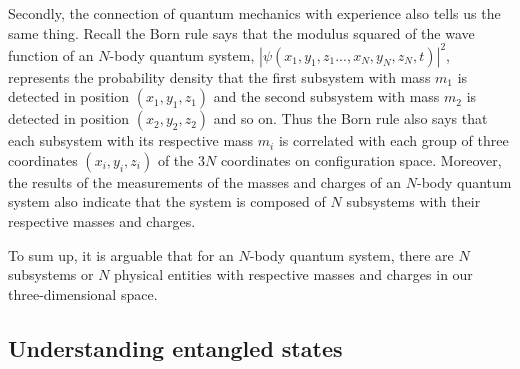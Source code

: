 Secondly, the connection of quantum mechanics with experience also tells us the same thing. Recall the Born rule says that the modulus squared of the wave function of an $N$-body quantum system, $|\psi(x_1,y_1,z_1..., x_N,y_N,z_N,t)|^2$, represents the probability density that the first subsystem with mass $m_1$ is detected in position $(x_1,y_1,z_1)$ and the second subsystem with mass $m_2$ is detected in position $(x_2,y_2,z_2)$ and so on. Thus the Born rule also says that each subsystem with its respective mass $m_i$ is  correlated with each group of three coordinates $(x_i, y_i, z_i)$ of the $3N$ coordinates on configuration space. Moreover, the results of the measurements of the masses and charges of an $N$-body quantum system also indicate that the system is composed of $N$ subsystems with their respective masses and charges.

To sum up, it is arguable that for an $N$-body quantum system, there are $N$ subsystems or $N$ physical entities with respective masses and charges in our three-dimensional space. 


\subsection{Understanding entangled states}

